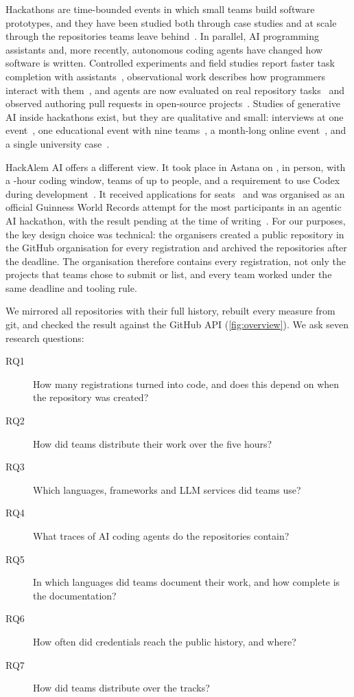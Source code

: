 \documentclass{article}
\begin{document}
Hackathons are time-bounded events in which small teams build software prototypes, and they have been studied both through case studies and at scale through the repositories teams leave behind~\cite{nolte2020hackathon,mcintosh2021hackathon,halmans2026hackrep}. In parallel, AI programming assistants and, more recently, autonomous coding agents have changed how software is written. Controlled experiments and field studies report faster task completion with assistants~\cite{peng2023copilot,ziegler2024copilot}, observational work describes how programmers interact with them~\cite{barke2023grounded,liang2024usability}, and agents are now evaluated on real repository tasks~\cite{jimenez2023swebench,yang2024sweagent} and observed authoring pull requests in open-source projects~\cite{li2025aidev,agarwal2026aiides}. Studies of generative AI inside hackathons exist, but they are qualitative and small: interviews at one event~\cite{zhou2026quickbuild}, one educational event with nine teams~\cite{gama2025vibes}, a month-long online event~\cite{chen2026codeforall}, and a single university case~\cite{sajja2024genaihack}.

HackAlem AI offers a different view. It took place in Astana on \eventdate, in person, with a \eventhours-hour coding window, teams of up to \teamsizemax{} people, and a requirement to use Codex during development~\cite{hackalem2026site}. It received \applications{} applications for \seats{} seats~\cite{qumash2026queue,ulys2026survival} and was organised as an official Guinness World Records attempt for the most participants in an agentic AI hackathon, with the result pending at the time of writing~\cite{astanatimes2026guinness}. For our purposes, the key design choice was technical: the organisers created a public repository in the \ghorg{} GitHub organisation for every registration and archived the repositories after the deadline. The organisation therefore contains every registration, not only the projects that teams chose to submit or list, and every team worked under the same deadline and tooling rule.

We mirrored all \NReposTotal{} repositories with their full history, rebuilt every measure from git, and checked the result against the GitHub API (\cref{fig:overview}). We ask seven research questions:

\begin{description}
  \item[RQ1] How many registrations turned into code, and does this depend on when the repository was created?
  \item[RQ2] How did teams distribute their work over the five hours?
  \item[RQ3] Which languages, frameworks and LLM services did teams use?
  \item[RQ4] What traces of AI coding agents do the repositories contain?
  \item[RQ5] In which languages did teams document their work, and how complete is the documentation?
  \item[RQ6] How often did credentials reach the public history, and where?
  \item[RQ7] How did teams distribute over the \NTracksCount{} tracks?
\end{description}
\end{document}
